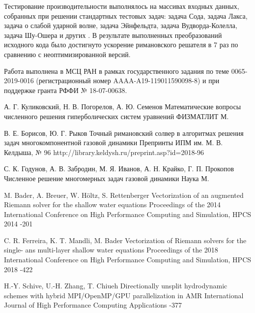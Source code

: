 \documentclass[utf8]{psta}
\begin{document}
Тестирование производительности выполнялось на массивах входных данных, собранных при решении стандартных тестовых задач: задача Сода, задача Лакса, задача о слабой ударной волне, задача Эйнфельдта, задача Вудворда-Колелла, задача Шу-Ошера и других \cite{BulVolTest}.
В результате выполненных преобразований исходного кода было достигнуто ускорение римановского решателя в 7 раз по сравнению с неоптимизированной версий.

Работа выполнена в МСЦ РАН в рамках государственного задания по теме 0065-2019-0016 (регистрационный номер AAAA-A19-119011590098-8) и при поддержке гранта РФФИ № 18-07-00638. 

\begin{thebibliography}{30}

\by А. Г. Куликовский, Н. В. Погорелов, А. Ю. Семенов
\book Математические вопросы численного решения гиперболических систем уравнений
\publ ФИЗМАТЛИТ
\publaddr М.

\by В. Е. Борисов, Ю. Г. Рыков
\preprint Точный римановский солвер в алгоритмах решения задач многокомпонентной газовой динамики
\preprintinfo Препринты ИПМ им. М. В. Келдыша, № 96
\URL http://library.keldysh.ru/preprint.asp?id=2018-96

\by С. К. Годунов, А. В. Забродин, М. Я. Иванов, А. Н. Крайко, Г. П. Прокопов
\book Численное решение многомерных задач газовой динамики
\publ Наука
\publaddr М.

\by M. Bader, A. Breuer, W. H{\"o}ltz, S. Rettenberger
\paper Vectorization of an augmented Riemann solver for the shallow water equations
\jour Proceedings of the 2014 International Conference on High Performance Computing and Simulation, HPCS 2014
-201

\by C. R. Ferreira, K. T. Mandli, M. Bader
\paper Vectorization of Riemann solvers for the single- ans multi-layer shallow water equations
\jour Proceedings of the 2018 International Conference on High Performance Computing and Simulation, HPCS 2018
-422

\by H.-Y. Schive, U.-H. Zhang, T. Chiueh
\paper Directionally unsplit hydrodynamic schemes with hybrid MPI/OpenMP/GPU parallelization in AMR
\jour International Journal of High Performance Computing Applications
-377


\end{thebibliography}
\end{document}
